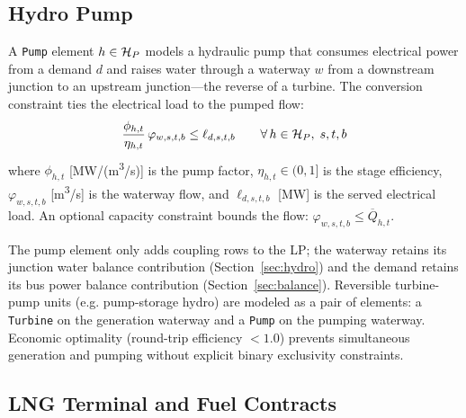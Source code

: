 \subsection{Hydro Pump}
\label{sec:pump}

A \texttt{Pump} element $h \in \mathcal{H}_P$ models a hydraulic pump
that consumes electrical power from a demand $d$ and raises water
through a waterway $w$ from a downstream junction to an upstream
junction---the reverse of a turbine.  The conversion constraint ties
the electrical load to the pumped flow:
\begin{equation}
\label{eq:pump}
\frac{\phi_{h,t}}{\eta_{h,t}} \, \varphi_{w,s,t,b} \leq \ell_{d,s,t,b}
\qquad \forall\, h \in \mathcal{H}_P,\; s,t,b
\end{equation}
where $\phi_{h,t}$ [MW/(m\textsuperscript{3}/s)] is the pump factor,
$\eta_{h,t} \in (0,1]$ is the stage efficiency, $\varphi_{w,s,t,b}$
[m\textsuperscript{3}/s] is the waterway flow, and
$\ell_{d,s,t,b}$ [MW] is the served electrical load.  An optional
capacity constraint bounds the flow:
$\varphi_{w,s,t,b} \leq \overline{Q}_{h,t}$.

The pump element only adds coupling rows to the LP; the waterway
retains its junction water balance contribution (Section~\ref{sec:hydro})
and the demand retains its bus power balance contribution
(Section~\ref{sec:balance}).  Reversible turbine-pump units (e.g.
pump-storage hydro) are modeled as a pair of elements: a
\texttt{Turbine} on the generation waterway and a \texttt{Pump} on the
pumping waterway.  Economic optimality (round-trip efficiency
$< 1.0$) prevents simultaneous generation and pumping without
explicit binary exclusivity constraints.

\subsection{LNG Terminal and Fuel Contracts}
\label{sec:lng}

